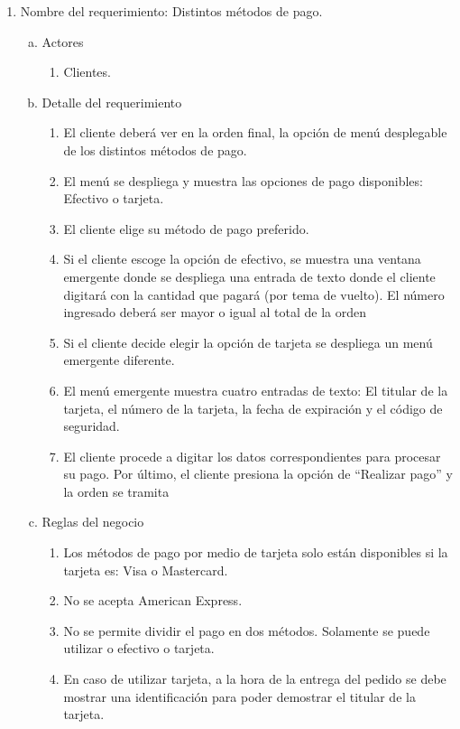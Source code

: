 \documentclass[conference]{IEEEtran}
\begin{document}
\begin{enumerate}
\item Nombre del requerimiento: Distintos métodos de pago.
\begin{enumerate}[a)]
\item Actores
	\begin{enumerate}[a]
	\item Clientes.
	\end{enumerate}
\item Detalle del requerimiento
	\begin{enumerate}[P{a}so 1.]
	\item El cliente deberá ver en la orden final, la opción de menú desplegable de los distintos métodos de pago.
	\item El menú se despliega y muestra las opciones de pago disponibles: Efectivo o tarjeta.
	\item El cliente elige su método de pago preferido. 
	\item Si el cliente escoge la opción de efectivo, se muestra una ventana emergente donde se despliega una entrada de texto donde el cliente digitará con la cantidad que pagará (por tema de vuelto). El número ingresado deberá ser mayor o igual al total de la orden
	\item Si el cliente decide elegir la opción de tarjeta se despliega un menú emergente diferente.
	\item El menú emergente muestra cuatro entradas de texto: El titular de la tarjeta, el número de la tarjeta, la fecha de expiración y el código de seguridad. 
	\item El cliente procede a digitar los datos correspondientes para procesar su pago. 
Por último, el cliente presiona la opción de “Realizar pago” y la orden se tramita
	\end{enumerate}
\item Reglas del negocio
	\begin{enumerate}[a]
	\item Los métodos de pago por medio de tarjeta solo están disponibles si la tarjeta es: Visa o Mastercard. 			\item No se acepta American Express.
	\item No se permite dividir el pago en dos métodos. Solamente se puede utilizar o efectivo o tarjeta.
	\item En caso de utilizar tarjeta, a la hora de la entrega del pedido se debe mostrar una identificación para poder demostrar el titular de la tarjeta. 

	\end{enumerate}
\end{enumerate}


\end{enumerate}
\end{document}
